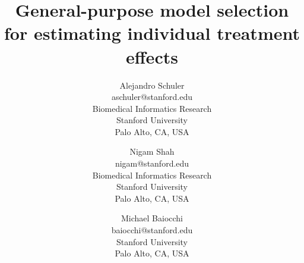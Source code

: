 \documentclass{article}
\begin{document}
\title{General-purpose model selection for estimating individual treatment effects}

\author{Alejandro Schuler \\
	aschuler@stanford.edu \\
       Biomedical Informatics Research\\
       Stanford University\\
       Palo Alto, CA, USA 
          \and
     Nigam Shah \\
     nigam@stanford.edu \\
       Biomedical Informatics Research\\
       Stanford University\\
       Palo Alto, CA, USA 
                 \and
     Michael Baiocchi \\
     baiocchi@stanford.edu \\
       Stanford University\\
       Palo Alto, CA, USA}

\maketitle



 







\end{document}
